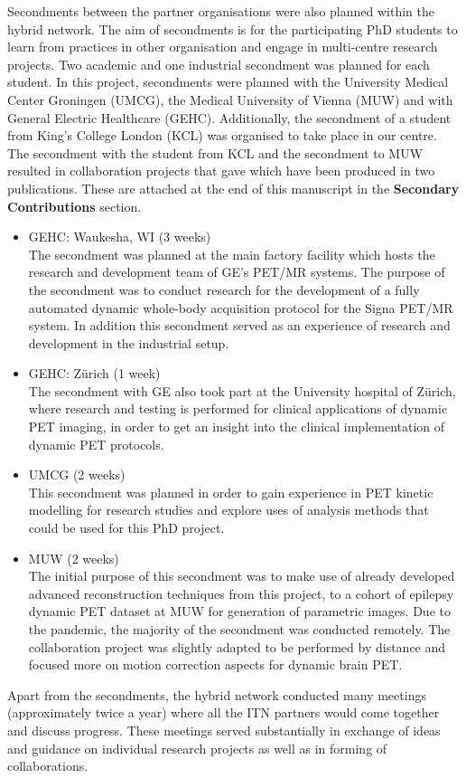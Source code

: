 Secondments between the partner organisations were also planned within the \gls{hybrid} network. The aim of secondments is for the participating PhD students to learn from practices in other organisation and engage in multi-centre research projects. Two academic and one industrial secondment was planned for each student. 
In this project, secondments were planned with the University Medical Center Groningen (UMCG), the Medical University of Vienna (MUW) and with General Electric Healthcare (GEHC).
Additionally, the secondment of a student from King's College London (KCL) was organised to take place in our centre. 
The secondment with the student from KCL and the secondment to MUW resulted in collaboration projects that gave which have been produced in two publications. These are attached at the end of this manuscript in the \textbf{Secondary Contributions} section. 

\begin{itemize}
    \item GEHC: Waukesha, WI (3 weeks) \\
    The secondment was planned at the main factory facility which hosts the research and development team of GE's PET/MR systems. The purpose of the secondment was to conduct research for the development of a fully automated dynamic whole-body acquisition protocol for the Signa PET/MR system.
    In addition this secondment served as an experience of research and development in the industrial setup.
    \item GEHC: Zürich (1 week) \\
    The secondment with GE also took part at the University hospital of Zürich, where research and testing is performed for clinical applications of dynamic PET imaging, in order to get an insight into the clinical implementation of dynamic PET protocols.
    \item UMCG (2 weeks) \\
    This secondment was planned in order to gain experience in PET kinetic modelling for research studies and explore uses of analysis methods that could be used for this PhD project. 
    \item MUW (2 weeks) \\
    The initial purpose of this secondment was to make use of already developed advanced reconstruction techniques from this project, to a cohort of epilepsy dynamic PET dataset at MUW for generation of parametric images. Due to the pandemic, the majority of the secondment was conducted remotely. The collaboration project was slightly adapted to be performed by distance and focused more on motion correction aspects for dynamic brain PET.
    
\end{itemize}

Apart from the secondments, the \gls{hybrid} network conducted many meetings (approximately twice a year) where all the ITN partners would come together and discuss progress. These meetings served substantially in exchange of ideas and guidance on individual research projects as well as in forming of collaborations. 

